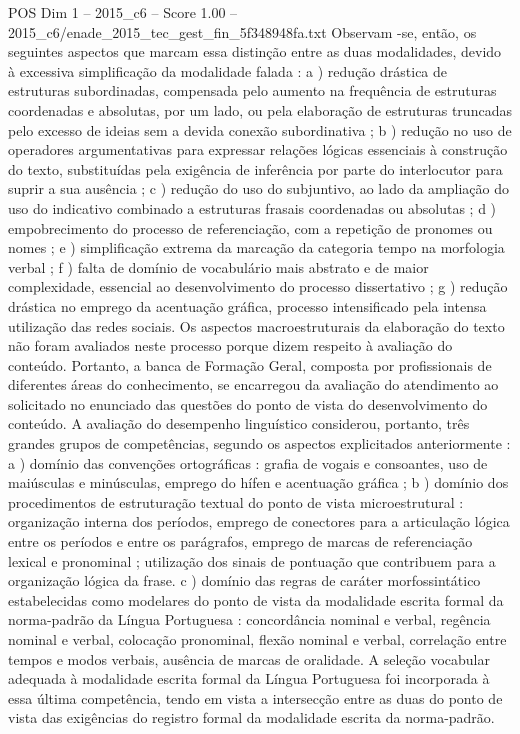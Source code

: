 \begin{textsample}{POS Dim 1 – 2015\_c6 – Score 1.00 – 2015\_c6/enade\_2015\_tec\_gest\_fin\_5f348948fa.txt}
Observam -se, então, os seguintes aspectos que marcam essa distinção entre as duas modalidades, devido à excessiva simplificação da modalidade falada : a ) redução drástica de estruturas subordinadas, compensada pelo aumento na frequência de estruturas coordenadas e absolutas, por um lado, ou pela elaboração de estruturas truncadas pelo excesso de ideias sem a devida conexão subordinativa ; b ) redução no uso de operadores argumentativas para expressar relações lógicas essenciais à construção do texto, substituídas pela exigência de inferência por parte do interlocutor para suprir a sua ausência ; c ) redução do uso do subjuntivo, ao lado da ampliação do uso do indicativo combinado a estruturas frasais coordenadas ou absolutas ; d ) empobrecimento do processo de referenciação, com a repetição de pronomes ou nomes ; e ) simplificação extrema da marcação da categoria tempo na morfologia verbal ; f ) falta de domínio de vocabulário mais abstrato e de maior complexidade, essencial ao desenvolvimento do processo dissertativo ; g ) redução drástica no emprego da acentuação gráfica, processo intensificado pela intensa utilização das redes sociais.
Os aspectos macroestruturais da elaboração do texto não foram avaliados neste processo porque dizem respeito à avaliação do conteúdo.
Portanto, a banca de Formação Geral, composta por profissionais de diferentes áreas do conhecimento, se encarregou da avaliação do atendimento ao solicitado no enunciado das questões do ponto de vista do desenvolvimento do conteúdo.
A avaliação do desempenho linguístico considerou, portanto, três grandes grupos de competências, segundo os aspectos explicitados anteriormente : a ) domínio das convenções ortográficas : grafia de vogais e consoantes, uso de maiúsculas e minúsculas, emprego do hífen e acentuação gráfica ; b ) domínio dos procedimentos de estruturação textual do ponto de vista microestrutural : organização interna dos períodos, emprego de conectores para a articulação lógica entre os períodos e entre os parágrafos, emprego de marcas de referenciação lexical e pronominal ; utilização dos sinais de pontuação que contribuem para a organização lógica da frase. c ) domínio das regras de caráter morfossintático estabelecidas como modelares do ponto de vista da modalidade escrita formal da norma-padrão da Língua Portuguesa : concordância nominal e verbal, regência nominal e verbal, colocação pronominal, flexão nominal e verbal, correlação entre tempos e modos verbais, ausência de marcas de oralidade.
A seleção vocabular adequada à modalidade escrita formal da Língua Portuguesa foi incorporada à essa última competência, tendo em vista a intersecção entre as duas do ponto de vista das exigências do registro formal da modalidade escrita da norma-padrão.

\end{textsample}
